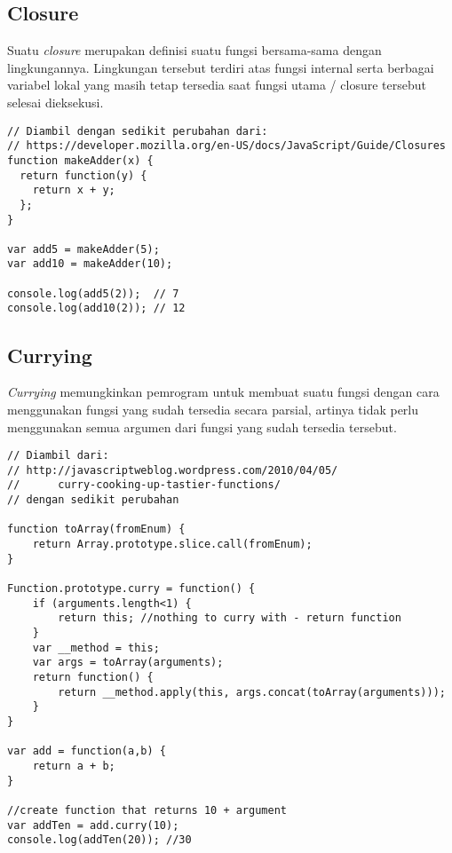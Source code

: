\subsection{Closure}

Suatu \textit{closure} merupakan definisi suatu fungsi bersama-sama dengan lingkungannya. Lingkungan tersebut terdiri atas fungsi internal serta berbagai variabel lokal yang masih tetap tersedia saat fungsi utama / closure tersebut selesai dieksekusi. 

\lstset{language=JavaScript,caption=Closure di JavaScript}
\begin{lstlisting}
// Diambil dengan sedikit perubahan dari:
// https://developer.mozilla.org/en-US/docs/JavaScript/Guide/Closures
function makeAdder(x) {
  return function(y) {
    return x + y;
  };
}
 
var add5 = makeAdder(5);
var add10 = makeAdder(10);
 
console.log(add5(2));  // 7
console.log(add10(2)); // 12
\end{lstlisting}

\subsection{Currying}

\textit{Currying} memungkinkan pemrogram untuk membuat suatu fungsi dengan cara menggunakan fungsi yang sudah tersedia secara parsial, artinya tidak perlu menggunakan semua argumen dari fungsi yang sudah tersedia tersebut.

\lstset{language=JavaScript,caption=Currying di JavaScript}
\begin{lstlisting}
// Diambil dari:
// http://javascriptweblog.wordpress.com/2010/04/05/
// 		curry-cooking-up-tastier-functions/
// dengan sedikit perubahan

function toArray(fromEnum) {
    return Array.prototype.slice.call(fromEnum);
}

Function.prototype.curry = function() {
    if (arguments.length<1) {
        return this; //nothing to curry with - return function
    }
    var __method = this;
    var args = toArray(arguments);
    return function() {
        return __method.apply(this, args.concat(toArray(arguments)));
    }
}

var add = function(a,b) {
    return a + b;
}

//create function that returns 10 + argument
var addTen = add.curry(10); 
console.log(addTen(20)); //30
\end{lstlisting}


